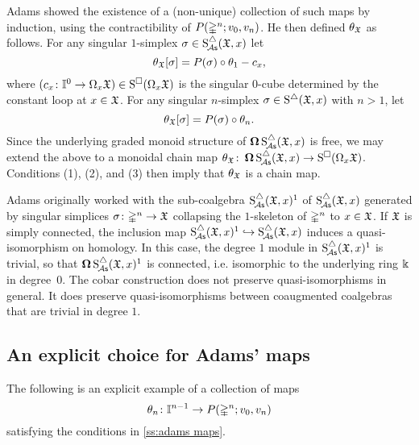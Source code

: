 Adams showed the existence of a (non-unique) collection of such maps by induction, using the contractibility of $P(\mathbb{\Delta}^n;v_0,v_n)$.
He then defined $\theta_{\mathfrak{X}}$ as follows.
For any singular $1$-simplex $\sigma \in \operatorname{S^{\triangle}_{\!{\mathcal{A}\mathsf{s}}}}(\mathfrak{X},x)$ let
\[
\theta_{\mathfrak{X}}[\sigma] = P(\sigma) \circ \theta_1 - c_x,
\]
where $(c_x \colon \mathbb{I}^0 \to \Omega_x \mathfrak{X}) \in \operatorname{S^{\square}}(\Omega_x \mathfrak{X})$ is the singular $0$-cube determined by the constant loop at $x \in \mathfrak{X}$.
For any singular $n$-simplex $\sigma \in \operatorname{S^{\triangle}}(\mathfrak{X},x)$ with $n>1$, let
\[
\theta_{\mathfrak{X}}[\sigma] = P(\sigma) \circ \theta_n.
\]
Since the underlying graded monoid structure of $\operatorname{\mathbf{\Omega}} \operatorname{S^{\triangle}_{\!{\mathcal{A}\mathsf{s}}}}(\mathfrak{X},x)$ is free, we may extend the above to a monoidal chain map $\theta_{\mathfrak{X}} \colon \operatorname{\mathbf{\Omega}} \operatorname{S^{\triangle}_{\!{\mathcal{A}\mathsf{s}}}}(\mathfrak{X},x) \to \operatorname{S^{\square}}(\Omega_x \mathfrak{X})$.
Conditions (1), (2), and (3) then imply that $\theta_{\mathfrak{X}}$ is a chain map.

\begin{remark}
	Adams originally worked with the sub-coalgebra $\operatorname{S^{\triangle}_{\!{\mathcal{A}\mathsf{s}}}}(\mathfrak{X},x)^1$ of $\operatorname{S^{\triangle}_{\!{\mathcal{A}\mathsf{s}}}}(\mathfrak{X},x)$ generated by singular simplices $\sigma \colon \mathbb{\Delta}^n \to \mathfrak{X}$ collapsing the $1$-skeleton of $\mathbb{\Delta}^n$ to $x \in \mathfrak{X}$.
	If $\mathfrak{X}$ is simply connected, the inclusion map $\operatorname{S^{\triangle}_{\!{\mathcal{A}\mathsf{s}}}}(\mathfrak{X},x)^1 \hookrightarrow \operatorname{S^{\triangle}_{\!{\mathcal{A}\mathsf{s}}}}(\mathfrak{X},x)$ induces a quasi-isomorphism on homology.
	In this case, the degree $1$ module in $\operatorname{S^{\triangle}_{\!{\mathcal{A}\mathsf{s}}}}(\mathfrak{X},x)^1$ is trivial, so that $\operatorname{\mathbf{\Omega}} \operatorname{S^{\triangle}_{\!{\mathcal{A}\mathsf{s}}}}(\mathfrak{X},x)^1$ is connected, i.e.
	isomorphic to the underlying ring $\Bbbk$ in degree~$0$.
	The cobar construction does not preserve quasi-isomorphisms in general.
	It does preserve quasi-isomorphisms between coaugmented coalgebras that are trivial in degree $1$.
\end{remark}

\subsection{An explicit choice for Adams' maps}\label{explicitchoice}

The following is an explicit example of a collection of maps
\[
\theta_n \colon \mathbb{I}^{n-1} \to P(\mathbb{\Delta}^n;v_0,v_n)
\]
satisfying the conditions in \cref{ss:adams maps}.

